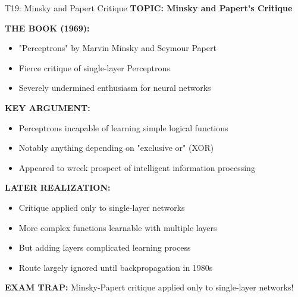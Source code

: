 \documentclass[8pt]{beamer}
\begin{document}
	\begin{frame}{T19: Minsky and Papert Critique}
		\fontsize{6.5}{7.5}\selectfont
		\textbf{TOPIC: Minsky and Papert's Critique}
		
		\vspace{0.1cm}
		\textbf{THE BOOK (1969):}
		\begin{itemize}
			\item "Perceptrons" by Marvin Minsky and Seymour Papert
			\item Fierce critique of single-layer Perceptrons
			\item Severely undermined enthusiasm for neural networks
		\end{itemize}
		
		\vspace{0.1cm}
		\textbf{KEY ARGUMENT:}
		\begin{itemize}
			\item Perceptrons incapable of learning simple logical functions
			\item Notably anything depending on "exclusive or" (XOR)
			\item Appeared to wreck prospect of intelligent information processing
		\end{itemize}
		
		\vspace{0.1cm}
		\textbf{LATER REALIZATION:}
		\begin{itemize}
			\item Critique applied only to single-layer networks
			\item More complex functions learnable with multiple layers
			\item But adding layers complicated learning process
			\item Route largely ignored until backpropagation in 1980s
		\end{itemize}
		
		\textcolor{myred}{\textbf{EXAM TRAP:}} Minsky-Papert critique applied \textcolor{myblue}{only to single-layer networks}!
	\end{frame}
	
\end{document}
